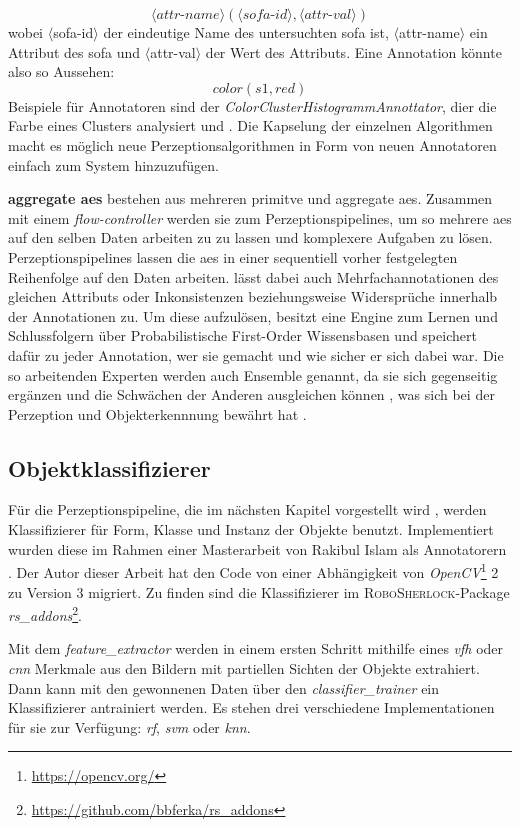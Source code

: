 \begin{displaymath}
\langle attr\text{-}name \rangle (\langle sofa\text{-}id \rangle , \langle attr\text{-}val \rangle)
\end{displaymath}
wobei $\langle$sofa-id$\rangle$ der eindeutige Name des untersuchten \gls{sofa} ist, $\langle$attr-name$\rangle$ ein Attribut des \gls{sofa} und $\langle$attr-val$\rangle$ der Wert des Attributs. Eine Annotation könnte also so Aussehen: 
\begin{displaymath}
color(s1, red)
\end{displaymath}
Beispiele für Annotatoren sind der \textit{ColorClusterHistogrammAnnottator}, dier die Farbe eines Clusters analysiert und . Die Kapselung der einzelnen Algorithmen macht es möglich neue Perzeptionsalgorithmen in Form von neuen Annotatoren einfach zum System hinzuzufügen. \par
\textbf{aggregate \glspl{ae}} bestehen aus mehreren primitve und aggregate \glspl{ae}. Zusammen mit einem \textit{flow-controller} werden sie zum Perzeptionspipelines, um so mehrere \glspl{ae} auf den selben Daten arbeiten zu zu lassen und komplexere Aufgaben zu lösen. Perzeptionspipelines lassen die \glspl{ae} in einer sequentiell vorher festgelegten Reihenfolge auf den Daten arbeiten. \robosherlock lässt dabei auch Mehrfachannotationen des gleichen Attributs oder Inkonsistenzen beziehungsweise Widersprüche innerhalb der Annotationen zu. Um diese aufzulösen, besitzt \robosherlock eine Engine zum Lernen und Schlussfolgern über Probabilistische First-Order Wissensbasen und speichert dafür zu jeder Annotation, wer sie gemacht und wie sicher er sich dabei war. Die so arbeitenden Experten werden auch Ensemble genannt, da sie sich gegenseitig ergänzen und die Schwächen der Anderen ausgleichen können \cite{polikar}, was sich bei der Perzeption und Objekterkennnung bewährt hat \cite{multimodalTemplate, atrBasedObjIden, pronobis1, pr2looking}.  
  
\subsection{Objektklassifizierer}
\label{sec:classifiers}
Für die Perzeptionspipeline, die im nächsten Kapitel vorgestellt wird , werden Klassifizierer für Form, Klasse und Instanz der Objekte benutzt. Implementiert wurden diese im Rahmen einer Masterarbeit von Rakibul Islam als \robosherlock Annotatorern \cite{rakib}. Der Autor dieser Arbeit hat den Code von einer Abhängigkeit von \textit{OpenCV}\footnote{\url{https://opencv.org/}} 2 zu Version 3 migriert. Zu finden sind die Klassifizierer im \textsc{RoboSherlock}-Package \textit{rs\_addons}\footnote{\url{https://github.com/bbferka/rs\_addons}}. \par
Mit dem \textit{feature\_extractor} werden in einem ersten Schritt mithilfe eines \textit{\gls{vfh}} oder \textit{\gls{cnn}} Merkmale aus den Bildern mit partiellen Sichten der Objekte extrahiert. Dann kann mit den gewonnenen Daten über den \textit{classifier\_trainer} ein Klassifizierer antrainiert werden. Es stehen drei verschiedene Implementationen für sie zur Verfügung: \textit{\gls{rf}}, \textit{\gls{svm}} oder \textit{\gls{knn}}.

